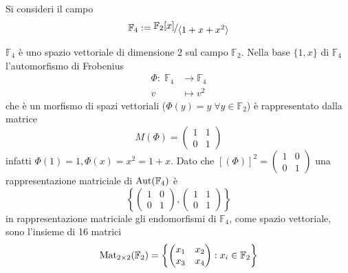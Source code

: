 \documentclass[../main.tex]{subfiles}
\begin{document}
\begin{example}
    Si consideri il campo
    \begin{eqnarray*}
        \mathbb{F}_4 := \nicefrac{\mathbb{F}_2[x]}{\langle 1 + x + x^2 \rangle}
    \end{eqnarray*}

    $\mathbb{F}_4$ è uno spazio vettoriale di dimensione 2 sul campo $\mathbb{F}_2$. Nella base $\{1, x\}$ di $\mathbb{F}_4$ l'automorfismo di Frobenius
    \begin{align*}
        \Phi : \; \mathbb{F}_4 & \rightarrow \mathbb{F}_4 \\
        v                      & \mapsto v^2
    \end{align*}
    che è un morfismo di spazi vettoriali ($\Phi(y) = y \; \forall y \in \mathbb{F}_2$) è rappresentato dalla matrice
    \begin{equation*}
        M(\Phi) = \begin{pmatrix}
            1 & 1 \\
            0 & 1
        \end{pmatrix}
    \end{equation*}
    infatti $\Phi(1) = 1, \Phi(x) = x^2 = 1 + x$. Dato che $[(\Phi)]^2 = \begin{pmatrix}
            1 & 0 \\
            0 & 1
        \end{pmatrix}$ una rappresentazione matriciale di $\operatorname{Aut}(\mathbb{F}_4)$ è\\
    \begin{equation*}
        \left\{\begin{pmatrix}
            1 & 0 \\
            0 & 1
        \end{pmatrix},
        \begin{pmatrix}
            1 & 1 \\
            0 & 1
        \end{pmatrix}\right\}
    \end{equation*}
    in rappresentazione matriciale gli endomorfismi di $\mathbb{F}_4$, come spazio vettoriale, sono l'insieme di 16 matrici
    \begin{equation*}
        \operatorname{Mat}_{2 \times 2}(\mathbb{F}_2) = \left\{
        \begin{pmatrix}
            x_1 & x_2 \\
            x_3 & x_4
        \end{pmatrix} :
        x_i \in \mathbb{F}_2\right\}
    \end{equation*}
\end{example}
\end{document}
